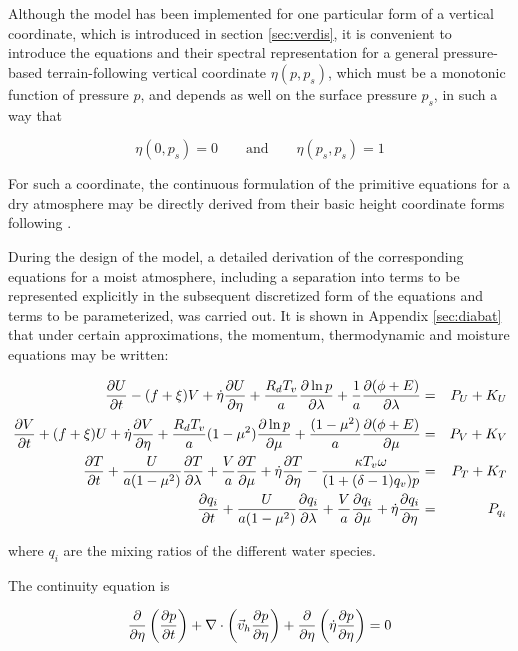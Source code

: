 Although the model has been implemented for one particular form of a
vertical coordinate, which is introduced in section \ref{sec:verdis},
it is convenient to introduce the equations and their spectral
representation for a general pressure-based terrain-following vertical
coordinate $\eta(p,p_s)$, which must be a monotonic function of
pressure $p$, and depends as well on the surface pressure $p_s$, in
such a way that

\[
\eta(0,p_s) = 0 \qquad \mbox{and} \qquad \eta(p_s,p_s) = 1
\]

For such a coordinate, the continuous formulation of the primitive
equations for a dry atmosphere may be directly derived from their
basic height coordinate forms following \cite{kasahara74}.

During the design of the model, a detailed derivation of the
corresponding equations for a moist atmosphere, including a separation
into terms to be represented explicitly in the subsequent discretized
form of the equations and terms to be parameterized, was carried
out. It is shown in Appendix \ref{sec:diabat} that under certain
approximations, the momentum, thermodynamic and moisture equations may
be written:

\begin{eqnarray}
\frac {\partial U} {\partial t}-(f+\xi)V+\dot{\eta}\frac {\partial U} {\partial \eta}+\frac{R_dT_v}{a}
  \frac {\partial \ln{p}} {\partial \lambda}+\frac{1}{a}\frac {\partial (\phi+E)} {\partial \lambda} 
& = & P_U+K_U
\label{(2.2.1)}
\\
\frac {\partial V} {\partial t} +(f+\xi)U+\dot{\eta}\frac {\partial V} {\partial \eta}+\frac{R_dT_v}{a}(1-\mu^2)
\frac {\partial \ln{p}} {\partial \mu}+\frac{(1-\mu^2)}{a}\frac {\partial (\phi+E)} {\partial \mu} 
& = & P_V+K_V
\label{(2.2.2)}
\\ 
\frac {\partial T} {\partial t} +\frac{U}{a(1-\mu^2)}\frac {\partial T} {\partial \lambda}+\frac{V}{a}\frac {\partial T} {\partial \mu}
+\dot{\eta}\frac {\partial T} {\partial \eta}-\frac{\kappa T_v\omega}{(1+(\delta-1)q_v)p}
& = & P_T+K_T
\label{(2.2.3)}
\\ 
\frac {\partial q_i} {\partial t}+\frac{U}{a(1-\mu^2)}\frac {\partial q_i} {\partial \lambda}+\frac{V}{a}\frac {\partial q_i} {\partial \mu}
+\dot{\eta}\frac {\partial q_i} {\partial \eta}
& = & P_{q_i}
\label{(2.2.4)}
\end{eqnarray}

where $q_i$ are the mixing ratios of the different water species.

The continuity equation is

\begin{equation}
\frac {\partial } {\partial \eta}\left(\frac {\partial p} {\partial t}\right)+\nabla\cdot\left(\vec{v}_h\frac {\partial p} {\partial \eta}\right)
+\frac {\partial } {\partial \eta}\left({\dot{\eta}}\frac {\partial p} {\partial \eta}\right) = 0
\label{(2.2.6)} 
\end{equation}

